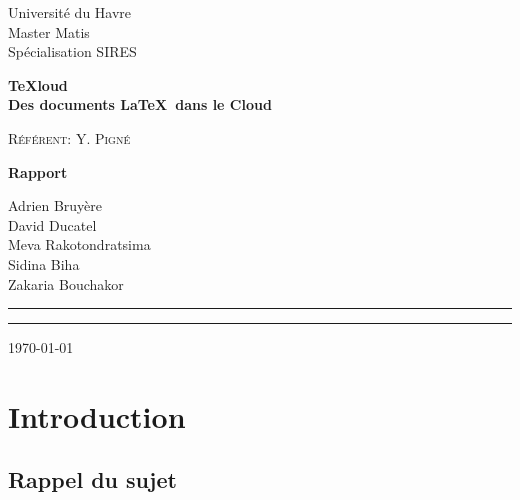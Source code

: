 \documentclass[a4paper,12pt]{article}
\begin{document}

\begin{titlepage}
\begin{flushleft}
\large{Universit\'e du Havre \\
Master Matis \\
Sp\'ecialisation SIRES\\
}
\end{flushleft}

\setlength{\parskip}{96pt}

\begin{center}
\huge\textbf{TeXloud\\Des documents \LaTeX ~dans le Cloud}

\setlength{\parskip}{18pt}
\large\textsc{Référent: Y. Pigné}

\setlength{\parskip}{70pt}

\Large\textbf{Rapport}

\setlength{\parskip}{50pt}

\large Adrien Bruyère\\David Ducatel\\Meva Rakotondratsima\\Sidina Biha\\Zakaria Bouchakor
\end{center}
\setlength{\parskip}{50pt}
\begin{flushleft}
\rule{.4mm}{26mm}\rule{105mm}{.4mm}
\today
\end{flushleft}
\end{titlepage}

 
\clearpage

\tableofcontents

\newpage

\section{Introduction}
\subsection{Rappel du sujet}
\paragraph*{}
\end{document}
